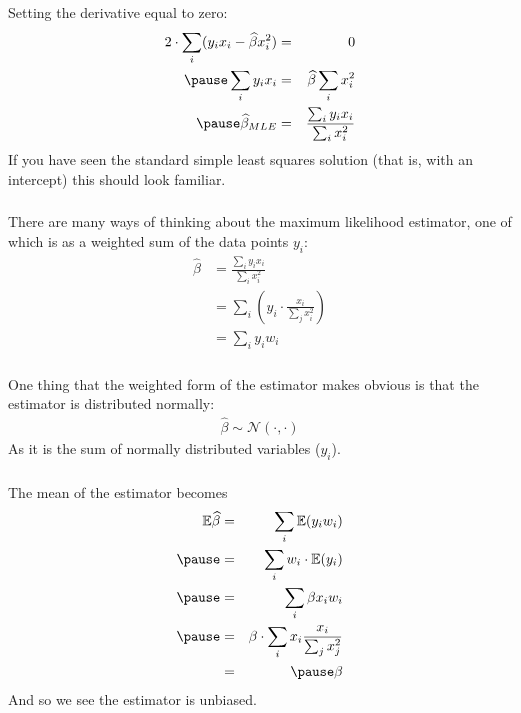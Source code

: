 \begin{frame}[fragile] \frametitle{}

Setting the derivative equal to zero:
\begin{eqnarray*}
2 \cdot \sum_i ( y_i x_i - \widehat{\beta} x_i^2) &=& 0 \\ \pause
\sum_i y_i x_i &=& \widehat{\beta} \sum_i x_i^2 \\ \pause
\widehat{\beta}_{MLE} &=& \frac{\sum_i y_i x_i}{\sum_i x_i^2}
\end{eqnarray*}
\pause If you have seen the standard simple least squares solution
(that is, with an intercept) this should look familiar.

\end{frame}


\begin{frame}[fragile] \frametitle{}

There are many ways of thinking about the maximum likelihood estimator,
one of which is as a weighted sum of the data points $y_i$:
\begin{align*}
\widehat{\beta} &= \frac{\sum_i y_i x_i}{\sum_i x_i^2} \\
&= \sum_i \left( y_i \cdot \frac{x_i}{\sum_j x_i^2} \right) \\
&= \sum_i y_i w_i
\end{align*}

\end{frame}

\begin{frame}[fragile] \frametitle{}

One thing that the weighted form of the estimator makes
obvious is that the estimator is distributed normally:
\begin{align*}
\widehat{\beta} \sim \mathcal{N} (\cdot, \cdot)
\end{align*}
As it is the sum of normally distributed variables ($y_i$).

\end{frame}

\begin{frame}[fragile] \frametitle{}

The mean of the estimator becomes
\begin{eqnarray*}
\mathbb{E} \widehat{\beta} &=& \sum_i \mathbb{E} (y_i w_i) \\ \pause
&=& \sum_i w_i \cdot \mathbb{E} (y_i) \\ \pause
&=& \sum_i \beta x_i w_i \\ \pause
&=& \beta \cdot \sum_i x_i \frac{x_i}{\sum_j x_j^2} \\
&=& \pause \beta
\end{eqnarray*}
And so we see the estimator is unbiased.

\end{frame}

